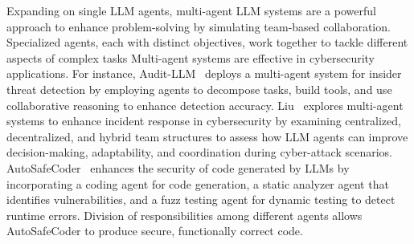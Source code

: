 Expanding on single LLM agents, multi-agent LLM systems are a powerful approach to enhance problem-solving by simulating team-based collaboration. Specialized agents, each with distinct objectives, work together to tackle different aspects of complex tasks \cite{guo2024largelanguagemodelbased}
Multi-agent systems are effective in cybersecurity applications. For instance, Audit-LLM~\cite{song2024audit} deploys a  multi-agent system for insider threat detection by employing agents to decompose tasks, build tools, and use collaborative reasoning to enhance detection accuracy. Liu~\cite{liu2024multi} explores multi-agent systems to enhance incident response in cybersecurity by examining centralized, decentralized, and hybrid team structures to assess how LLM agents can improve decision-making, adaptability, and coordination during cyber-attack scenarios. AutoSafeCoder~\cite{nunez2024autosafecoder} enhances the security of code generated by LLMs by incorporating a coding agent for code generation, a static analyzer agent that identifies vulnerabilities, and a fuzz testing agent for dynamic testing to detect runtime errors. Division of responsibilities among different agents allows AutoSafeCoder to produce secure, functionally correct code. 





